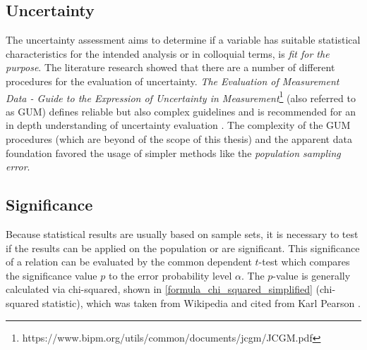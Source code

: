 \subsection{Uncertainty}
\label{correlation_uncertainty}
The uncertainty assessment aims to determine if a variable has suitable statistical characteristics for the intended analysis or in colloquial terms, is \textit{fit for the purpose}. The literature research showed that there are a number of different procedures for the evaluation of uncertainty. \textit{The Evaluation of Measurement Data - Guide to the Expression of Uncertainty in Measurement}\footnote{https://www.bipm.org/utils/common/documents/jcgm/JCGM.pdf} (also referred to as GUM) defines reliable but also complex guidelines and is recommended for an in depth understanding of uncertainty evaluation \parencite{Farrance2012}. The complexity of the GUM procedures (which are beyond of the scope of this thesis) and the apparent data foundation favored the usage of simpler methods like the \textit{population sampling error}. \parencite{ONS2020}



\subsection{Significance}
\label{correlation_significance}
Because statistical results are usually based on sample sets, it is necessary to test if the results can be applied on the population or are significant. This significance of a relation can be evaluated by the common dependent $t$-test which compares the significance value $p$ to the error probability level $\alpha$. The $p$-value is generally calculated via chi-squared, shown in \cref{formula_chi_squared_simplified} (chi-squared statistic), which was taken from Wikipedia and cited from Karl Pearson \parencite{Pearson1990}.

